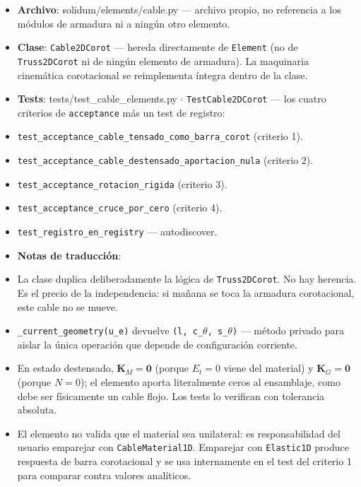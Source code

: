 \documentclass[11pt,letterpaper,oneside]{report}
\begin{document}
\begin{itemize}
  \item \textbf{Archivo}: solidum/elements/cable.py --- archivo propio, no referencia a los módulos de armadura ni a ningún otro elemento.
  \item \textbf{Clase}: \texttt{Cable2DCorot} --- hereda directamente de \texttt{Element} (no de \texttt{Truss2DCorot} ni de ningún elemento de armadura). La maquinaria cinemática corotacional se reimplementa íntegra dentro de la clase.
  \item \textbf{Tests}: tests/test\_cable\_elements.py \ensuremath{\cdot} \texttt{TestCable2DCorot} --- los cuatro criterios de \texttt{acceptance} más un test de registro:
  \item \texttt{test\_acceptance\_cable\_tensado\_como\_barra\_corot} (criterio 1).
  \item \texttt{test\_acceptance\_cable\_destensado\_aportacion\_nula} (criterio 2).
  \item \texttt{test\_acceptance\_rotacion\_rigida} (criterio 3).
  \item \texttt{test\_acceptance\_cruce\_por\_cero} (criterio 4).
  \item \texttt{test\_registro\_en\_registry} --- autodiscover.
  \item \textbf{Notas de traducción}:
  \item La clase duplica deliberadamente la lógica de \texttt{Truss2DCorot}. No hay herencia. Es el precio de la independencia: si mañana se toca la armadura corotacional, este cable no se mueve.
  \item \texttt{\_current\_geometry(u\_e)} devuelve \texttt{(l, c\_\ensuremath{\theta}, s\_\ensuremath{\theta})} --- método privado para aislar la única operación que depende de configuración corriente.
  \item En estado destensado, $\mathbf K_M = \mathbf 0$ (porque $E_t = 0$ viene del material) y $\mathbf K_G = \mathbf 0$ (porque $N = 0$); el elemento aporta literalmente ceros al ensamblaje, como debe ser físicamente un cable flojo. Los tests lo verifican con tolerancia absoluta.
  \item El elemento no valida que el material sea unilateral: es responsabilidad del usuario emparejar con \texttt{CableMaterial1D}. Emparejar con \texttt{Elastic1D} produce respuesta de barra corotacional y se usa internamente en el test del criterio 1 para comparar contra valores analíticos.
\end{itemize}
\end{document}
